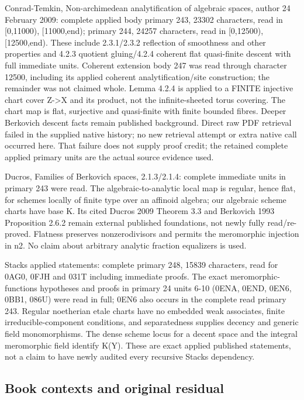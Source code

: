 \documentclass[11pt]{article}
\begin{document}
Conrad-Temkin, Non-archimedean analytification of algebraic spaces, author 24 February 2009: complete applied body primary 243, 23302 characters, read in [0,11000), [11000,end); primary 244, 24257 characters, read in [0,12500), [12500,end). These include 2.3.1/2.3.2 reflection of smoothness and other properties and 4.2.3 quotient gluing/4.2.4 coherent flat quasi-finite descent with full immediate units. Coherent extension body 247 was read through character 12500, including its applied coherent analytification/site construction; the remainder was not claimed whole. Lemma 4.2.4 is applied to a FINITE injective chart cover Z->X and its product, not the infinite-sheeted torus covering. The chart map is flat, surjective and quasi-finite with finite bounded fibres. Deeper Berkovich descent facts remain published background. Direct raw PDF retrieval failed in the supplied native history; no new retrieval attempt or extra native call occurred here. That failure does not supply proof credit; the retained complete applied primary units are the actual source evidence used.

Ducros, Families of Berkovich spaces, 2.1.3/2.1.4: complete immediate units in primary 243 were read. The algebraic-to-analytic local map is regular, hence flat, for schemes locally of finite type over an affinoid algebra; our algebraic scheme charts have base K. Its cited Ducros 2009 Theorem 3.3 and Berkovich 1993 Proposition 2.6.2 remain external published foundations, not newly fully read/re-proved. Flatness preserves nonzerodivisors and permits the meromorphic injection in n2. No claim about arbitrary analytic fraction equalizers is used.

Stacks applied statements: complete primary 248, 15839 characters, read for 0AG0, 0FJH and 031T including immediate proofs. The exact meromorphic-functions hypotheses and proofs in primary 24 units 6-10 (0ENA, 0END, 0EN6, 0BB1, 086U) were read in full; 0EN6 also occurs in the complete read primary 243. Regular noetherian etale charts have no embedded weak associates, finite irreducible-component conditions, and separatedness supplies decency and generic field monomorphisms. The dense scheme locus for a decent space and the integral meromorphic field identify K(Y). These are exact applied published statements, not a claim to have newly audited every recursive Stacks dependency.

\subsection*{Book contexts and original residual}
\end{document}
